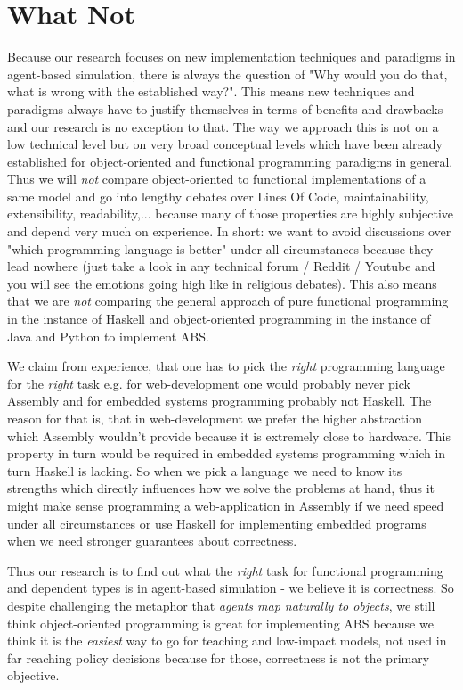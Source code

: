 \section{What Not}
\label{sect:what_not}
Because our research focuses on new implementation techniques and paradigms in agent-based simulation, there is always the question of "Why would you do that, what is wrong with the established way?". This means new techniques and paradigms always have to justify themselves in terms of benefits and drawbacks and our research is no exception to that. The way we approach this is not on a low technical level but on very broad conceptual levels which have been already established for object-oriented and functional programming paradigms in general. Thus we will \textit{not} compare object-oriented to functional implementations of a same model and go into lengthy debates over Lines Of Code, maintainability, extensibility, readability,... because many of those properties are highly subjective and depend very much on experience. In short: we want to avoid discussions over "which programming language is better" under all circumstances because they lead nowhere (just take a look in any technical forum / Reddit / Youtube and you will see the emotions going high like in religious debates). This also means that we are \textit{not} comparing the general approach of pure functional programming in the instance of Haskell and object-oriented programming in the instance of Java and Python to implement ABS.

We claim from experience, that one has to pick the \textit{right} programming language for the \textit{right} task e.g. for web-development one would probably never pick Assembly and for embedded systems programming probably not Haskell. The reason for that is, that in web-development we prefer the higher abstraction which Assembly wouldn't provide because it is extremely close to hardware. This property in turn would be required in embedded systems programming which in turn Haskell is lacking. So when we pick a language we need to know its strengths which directly influences how we solve the problems at hand, thus it might make sense programming a web-application in Assembly if we need speed under all circumstances or use Haskell for implementing embedded programs when we need stronger guarantees about correctness.

Thus our research is to find out what the \textit{right} task for functional programming and dependent types is in agent-based simulation - we believe it is correctness. So despite challenging the metaphor that \textit{agents map naturally to objects}, we still think object-oriented programming is great for implementing ABS because we think it is the \textit{easiest} way to go for teaching and low-impact models, not used in far reaching policy decisions because for those, correctness is not the primary objective.

